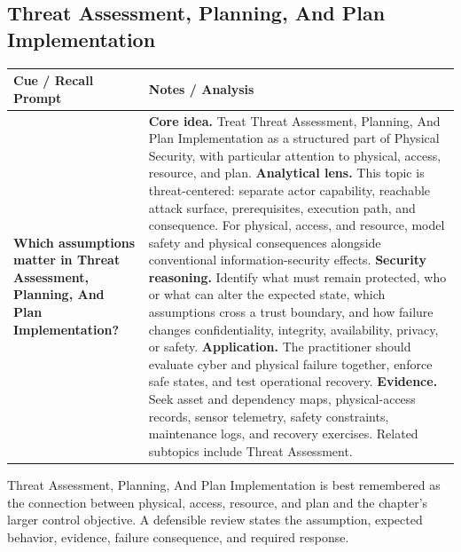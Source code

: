 \documentclass[11pt]{article}
\newcommand{\CornellHeader}{%
\rowcolor{Navy}\color{white}\bfseries Cue / Recall Prompt & \color{white}\bfseries Notes / Analysis\\\hline}
\newcommand{\CornellRow}[2]{%
\cellcolor{CueGray}\RaggedRight\textbf{#1} & \RaggedRight #2\\\hline}
\begin{document}
\subsection*{Threat Assessment, Planning, And Plan Implementation}
\begin{longtable}{>{\RaggedRight\arraybackslash}p{}|>{\RaggedRight\arraybackslash}p{}}
\CornellHeader
\CornellRow{Which assumptions matter in Threat Assessment, Planning, And Plan Implementation?}{\textbf{Core idea.} Treat Threat Assessment, Planning, And Plan Implementation as a structured part of Physical Security, with particular attention to physical, access, resource, and plan. \textbf{Analytical lens.} This topic is threat-centered: separate actor capability, reachable attack surface, prerequisites, execution path, and consequence. For physical, access, and resource, model safety and physical consequences alongside conventional information-security effects. \textbf{Security reasoning.} Identify what must remain protected, who or what can alter the expected state, which assumptions cross a trust boundary, and how failure changes confidentiality, integrity, availability, privacy, or safety. \textbf{Application.} The practitioner should evaluate cyber and physical failure together, enforce safe states, and test operational recovery. \textbf{Evidence.} Seek asset and dependency maps, physical-access records, sensor telemetry, safety constraints, maintenance logs, and recovery exercises. Related subtopics include Threat Assessment.}
\end{longtable}
\begin{topicsummary}
Threat Assessment, Planning, And Plan Implementation is best remembered as the connection between physical, access, resource, and plan and the chapter's larger control objective. A defensible review states the assumption, expected behavior, evidence, failure consequence, and required response.
\end{topicsummary}
\end{document}

